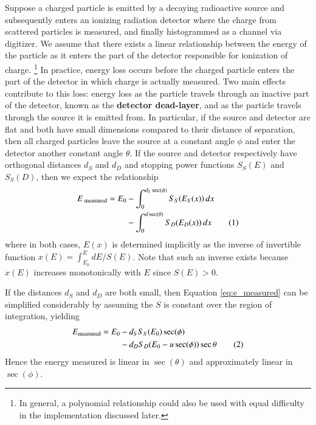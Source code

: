 \documentclass[11pt]{article}
\newcommand{\eqrefn}[1]{Equation \ref{eq:#1}}
\newcommand\numberthis{\addtocounter{equation}{1}\tag{\theequation}}
\newcommand{\dx}{\, dx}
\begin{document}
\begin{multicols}{2}
Suppose a charged particle is emitted by a decaying radioactive source and subsequently enters an ionizing radiation detector where the charge from scattered particles is measured, and finally histogrammed as a channel via digitizer. We assume that there exists a linear relationship between the energy of the particle as it enters the part of the detector responsible for ionization of charge.%
\footnote{In general, a polynomial relationship could also be used with equal difficulty in the implementation discussed later.}
%
In practice, energy loss occurs before the charged particle enters the part of the detector in which charge is actually measured. Two main effects contribute to this loss: energy loss as the particle travels through an inactive part of the detector, known as the \textbf{detector dead-layer}, and as the particle travels through the source it is emitted from. In particular, if the source and detector are flat and both have small dimensions compared to their distance of separation, then all charged particles leave the source at a constant angle $\phi$ and enter the detector another constant angle $\theta$. If the source and detector respectively have orthogonal distances $ d_S $ and $ d_D $ and stopping power functions $S_S(E)$ and $S_S(D)$, then we expect the relationship
%
	\begin{align*}
 		E_\text{	measured} = E_0 &- \int_{0}^{ d_S \sec (\phi) } S_S(E_S(x)) \dx 
			\\ &- \int_{0}^{ d \sec( \theta)} S_D(E_D(x)) \dx
				\numberthis 	\label{eq:e_measured}
	\end{align*}
where in both cases, $E(x)$ is determined implicitly as the inverse of invertible function $x(E) = \int_{E_0}^E dE / S(E) $. Note that such an inverse exists because $x(E)$ increases monotonically with $E$ since $S(E) > 0$.

If the distances $d_S$ and $d_D$ are both small, then \eqrefn{e_measured} can be simplified considerably by assuming the $S$ is constant over the region of integration, yielding
	\begin{align*}
 		E_\text{measured} = E_0 &- d_S  S_S(E_0)  \sec (\phi) 
			\\ &-  d_D S_D( E_0 - u\sec (\phi ) ) \sec \theta
				  \numberthis \label{eq:s_linear}
	\end{align*}	
Hence the energy measured is linear in $\sec(\theta)$ and approximately linear in $ \sec(\phi) $. %


\end{multicols}
\end{document}
